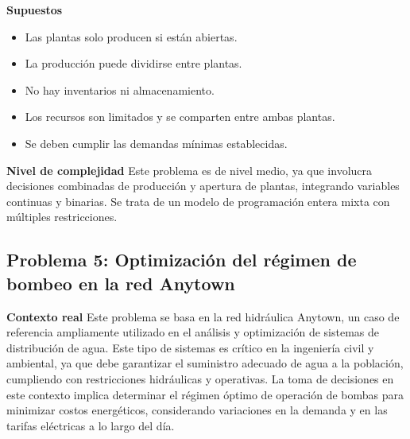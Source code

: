 \documentclass[12pt,a4paper]{article}
\begin{document}
\textbf{Supuestos}
\begin{itemize}[leftmargin=*]
	\item Las plantas solo producen si están abiertas.
	\item La producción puede dividirse entre plantas.
	\item No hay inventarios ni almacenamiento.
	\item Los recursos son limitados y se comparten entre ambas plantas.
	\item Se deben cumplir las demandas mínimas establecidas.
\end{itemize}

\textbf{Nivel de complejidad} Este problema es de nivel medio, ya que involucra decisiones combinadas de producción y apertura de plantas, integrando variables continuas y binarias. Se trata de un modelo de programación entera mixta con múltiples restricciones.

\subsection{Problema 5: Optimización del régimen de bombeo en la red Anytown}

\textbf{Contexto real} Este problema se basa en la red hidráulica Anytown, un caso de referencia ampliamente utilizado en el análisis y optimización de sistemas de distribución de agua. Este tipo de sistemas es crítico en la ingeniería civil y ambiental, ya que debe garantizar el suministro adecuado de agua a la población, cumpliendo con restricciones hidráulicas y operativas. La toma de decisiones en este contexto implica determinar el régimen óptimo de operación de bombas para minimizar costos energéticos, considerando variaciones en la demanda y en las tarifas eléctricas a lo largo del día.
\end{document}
